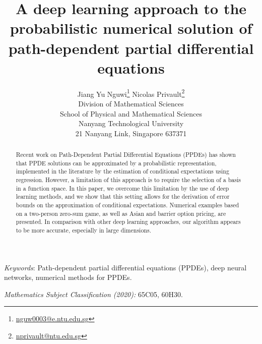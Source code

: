 \documentclass[12pt]{article}
\title{\Huge
 A deep learning approach to the probabilistic numerical solution of
 path-dependent partial differential equations
}
\author{
 Jiang Yu Nguwi\footnote{\href{mailto:nguw0003@e.ntu.edu.sg}{nguw0003@e.ntu.edu.sg}
 }
 \qquad Nicolas Privault\footnote{
\href{mailto:nprivault@ntu.edu.sg}{nprivault@ntu.edu.sg}
 }
 \\
  \small
Division of Mathematical Sciences
\\
\small
School of Physical and Mathematical Sciences
\\
\small
Nanyang Technological University
\\
\small
21 Nanyang Link, Singapore 637371
}
\numberwithin{equation}{section}
\begin{document}
\maketitle

\baselineskip0.6cm

\vspace{-0.6cm}

\begin{abstract}
  \medskip
  Recent work on Path-Dependent Partial Differential Equations (PPDEs)
  has shown that PPDE solutions can be approximated
  by a probabilistic representation, implemented in the literature
  by the estimation of conditional expectations using
  regression.
  However, a limitation of this approach is to require the selection of
  a basis in a function space. In this paper, we overcome this limitation
  by the use of deep learning methods, and we show
  that this setting allows for the derivation of
  error bounds on the approximation of conditional expectations.
 Numerical examples based on a two-person zero-sum game,
 as well as Asian and barrier option pricing, are presented.
 In comparison with other deep learning approaches,
 our algorithm %
 appears to be more accurate, especially in large dimensions.
\end{abstract}

\noindent
    {\em Keywords}:
    Path-dependent partial differential equations (PPDEs),
    deep neural networks,
    numerical methods for PPDEs.

\noindent
    {\em Mathematics Subject Classification (2020):}
    65C05, 60H30.

\baselineskip0.7cm

\parskip-0.1cm

\end{document}

